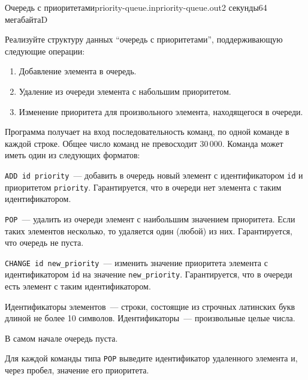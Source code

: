 \documentclass[12pt,a4paper,oneside,twocolumn,landscape]{article}
\begin{document}
\bigskip\bigskip
\begin{problem}{Очередь с приоритетами}{priority-queue.in}{priority-queue.out}{2 секунды}{64 мегабайта}{D}
\graphicspath{{.././priority-queue/statements/}}
Реализуйте структуру данных ``очередь с приоритетами'', поддерживающую
следующие операции:

\begin{enumerate}
\item Добавление элемента в очередь.
\item Удаление из очереди элемента с набольшим приоритетом.
\item Изменение приоритета для произвольного элемента, находящегося в
очереди.
\end{enumerate}

\InputFile
Программа получает на вход последовательность команд, по одной команде
в каждой строке. Общее число команд не превосходит
$30\,000$. Команда может иметь один из следующих форматов:

\verb"ADD id priority"~--- добавить в очередь новый элемент
с идентификатором \verb"id" и приоритетом \verb"priority".
Гарантируется, что в очереди нет элемента с таким идентификатором.

\verb"POP"~--- удалить из очереди элемент с наибольшим значением
приоритета. Если таких элементов несколько, то удаляется один
(любой) из них. Гарантируется, что очередь не пуста.

\verb"CHANGE id new_priority"~--- изменить значение приоритета
элемента с идентификатором \verb"id" на значение \verb"new_priority".
Гарантируется, что в очереди есть элемент с таким идентификатором.

Идентификаторы элементов~--- строки, состоящие из строчных латинских
букв длиной не более 10 символов. Идентификаторы~--- произвольные
целые числа.

В самом начале очередь пуста.

\OutputFile
Для каждой команды типа \verb"POP" выведите
идентификатор удаленного элемента и, через пробел,
значение его приоритета.

\Example

\begin{example}
%
\end{example}


\end{problem}
\end{document}
